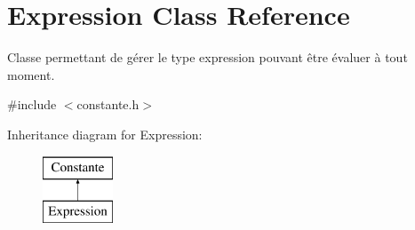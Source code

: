 \hypertarget{class_expression}{\section{Expression Class Reference}
\label{class_expression}
}


Classe permettant de gérer le type expression pouvant être évaluer à tout moment.  




{\ttfamily \#include $<$constante.\-h$>$}

Inheritance diagram for Expression\-:\begin{figure}[H]
\begin{center}
\leavevmode
\includegraphics[height=2.000000cm]{class_expression}
\end{center}
\end{figure}
